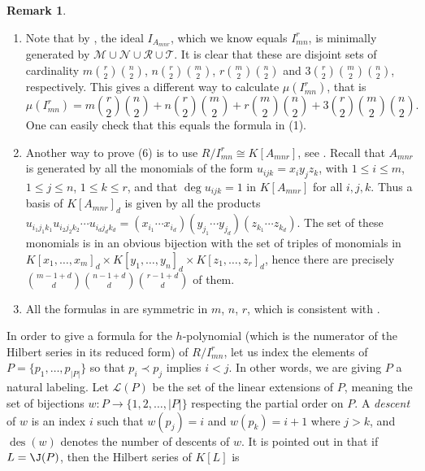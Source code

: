 \documentclass[12pt]{amsart}
\numberwithin{equation}{section}
\theoremstyle{definition}
\newtheorem{remark}[theorem]{Remark}
\begin{document}
\begin{remark}
\label{rmk:HSnotequal}
\begin{enumerate}
\item Note that by , the ideal $I_{A_{mnr}}$, which we know equals $I_{mn}^r$, is minimally generated by $\mathcal M\cup\mathcal N\cup\mathcal R\cup\mathcal T$. It is clear that these are disjoint sets of cardinality $m {r\choose 2} {n\choose 2}$, $n{r \choose 2}{m\choose 2}$, 
        $r{m \choose 2} {n\choose 2}$ and $3{r\choose 2}{m \choose 2}{n\choose 2}$, respectively. This gives a different way to calculate $\mu(I_{mn}^r)$, that is 
        $$\mu(I_{mn}^r)= m {r\choose 2} {n\choose 2}+n{r \choose 2}{m\choose 2}+r{m \choose 2} {n\choose 2}+3{r\choose 2}{m \choose 2}{n\choose 2}.$$
        One can easily check that this equals the formula  in (1).
    \item  Another way to prove (6) is to use $R/I_{mn}^r\cong K[A_{mnr}]$, see . Recall that $A_{mnr}$ is generated by all the monomials of the form $u_{ijk}=x_iy_jz_k$, with $ 1\le i\le m$, $ 1\le j\le n$, $1\le k\le r$, and that $\deg u_{ijk}=1$ in $K[A_{mnr}]$ for all $i,j,k$.
Thus a basis of $K[A_{mnr}]_d$ is given by all the products $u_{i_1j_1k_1}u_{i_2j_2k_2}\cdots u_{i_dj_dk_d}=(x_{i_1}\cdots x_{i_d})(y_{j_1}\cdots y_{j_d})(z_{k_1}\cdots z_{k_d})$. 
The set of these monomials is in an obvious bijection with the set of triples of monomials in $K[x_1,\ldots,x_m]_d\times K[y_1,\ldots,y_n]_d \times K[z_1,\ldots,z_r]_d$, hence there are precisely $\binom{m-1+d}{d}\binom{n-1+d}{d}\binom{r-1+d}{d}$ of them.
    \item All the formulas in  are symmetric in $m$, $n$, $r$, which is consistent with . 
    

 \end{enumerate}
\end{remark}



In order to give a formula for the $h$-polynomial (which is the numerator of the Hilbert series in its reduced form) of $R/I_{mn}^r$, let us index the elements of $P=\{p_1, \ldots, p_{|P|}\}$ so that $p_i\prec p_j$ implies $i<j$. In other words, we are giving $P$ a natural labeling.  Let $\mathcal{L}(P)$ be the set of the linear extensions of $P$, meaning the set of bijections $w: P \to \{1,2, \ldots, |P|\}$  respecting the partial order on $P$. A \emph{descent} of $w$ is an index $i$ such that $w(p_j)=i$ and $w(p_k)=i+1$ where $j>k$, and $\operatorname{des}(w)$ denotes the number of descents of $w$. 
It is pointed out in \cite[Proposition~2.3]{HiHi} that if $L=\J(P)$, then the Hilbert series of $K[L]$ is
\end{document}

